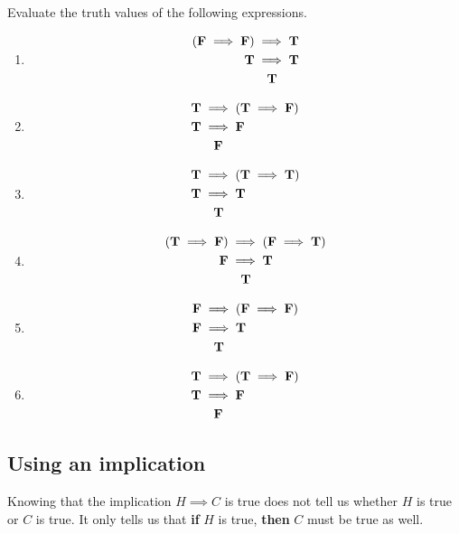 \begin{solutions}
	Evaluate the truth values of the following expressions.

		\begin{enumerate}
	\item \begin{align*}(\F \implies \F) &\implies \T \\  \T &\implies \T \\ &  \hphantom{ds}\T\end{align*}
	\item \begin{align*}\T &\implies (\T \implies \F) \\ \T &\implies \F \\  & \hphantom{ds}\F \end{align*}
	\item \begin{align*}\T &\implies (\T \implies \T) \\  \T &\implies \T  \\  &\hphantom{ds}\T\end{align*}
	\item \begin{align*}(\T \implies \F) &\implies (\F \implies \T) \\ \F &\implies \T \\ &\hphantom{ds}\T\end{align*}
	\item \begin{align*}\F &\implies (\F \implies \F) \\ \F &\implies \T \\ &\hphantom{ds}\T\end{align*}
	\item \begin{align*}\T &\implies (\T \implies \F) \\ \T &\implies \F \\ &\hphantom{ds}\F\end{align*}
\end{enumerate}	

\end{solutions}


\subsection{Using an implication}

Knowing that the implication $H \implies C$ is true does not tell us whether $H$ is true or $C$ is true.  It only tells us that \textbf{if} $H$ is true, \textbf{then} $C$ must be true as well.


